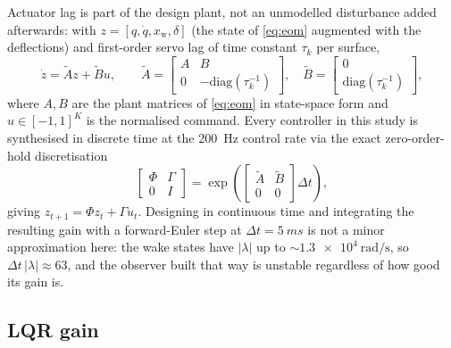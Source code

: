 \documentclass[preprint,11pt,authoryear]{elsarticle}
\begin{document}
Actuator lag is part of the design plant, not an unmodelled disturbance added
afterwards: with $z=[q,\dot q, x_{\mathrm{w}}, \delta]$ (the state of
\eqref{eq:eom} augmented with the deflections) and first-order servo lag of
time constant $\tau_k$ per surface,
\begin{equation}
\dot z = \tilde A z + \tilde B u, \qquad
\tilde A = \begin{bmatrix} A & B \\ 0 & -\mathrm{diag}(\tau_k^{-1}) \end{bmatrix},
\quad
\tilde B = \begin{bmatrix} 0 \\ \mathrm{diag}(\tau_k^{-1}) \end{bmatrix},
\label{eq:augplant}
\end{equation}
where $A,B$ are the plant matrices of \eqref{eq:eom} in state-space form and
$u\in[-1,1]^K$ is the normalised command. Every controller in this study is
synthesised in discrete time at the \SI{200}{\hertz} control rate via the exact
zero-order-hold discretisation
\begin{equation}
\begin{bmatrix} \Phi & \Gamma \\ 0 & I \end{bmatrix}
= \exp\!\left( \begin{bmatrix} \tilde A & \tilde B \\ 0 & 0 \end{bmatrix} \Delta t \right),
\label{eq:zoh}
\end{equation}
giving $z_{t+1} = \Phi z_t + \Gamma u_t$. Designing in continuous time and
integrating the resulting gain with a forward-Euler step at $\Delta t=\SI{5}{ms}$
is not a minor approximation here: the wake states have $|\lambda|$ up to
$\sim\!\SI{1.3e4}{\radian\per\second}$, so $\Delta t\,|\lambda|\approx 63$, and
the observer built that way is unstable regardless of how good its gain is.

\subsection{LQR gain}
\end{document}
